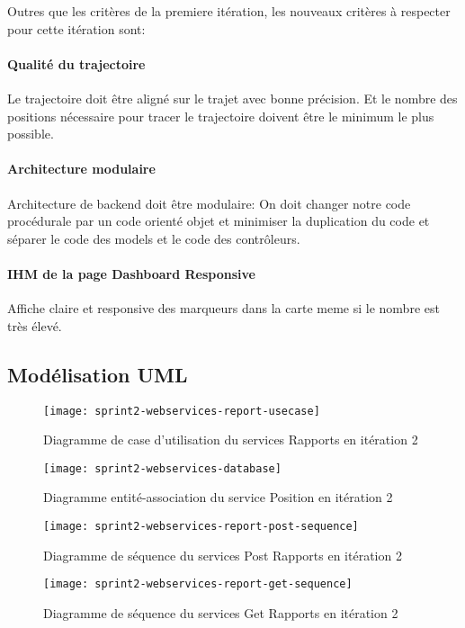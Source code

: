 Outres que les critères de la premiere itération, les nouveaux critères à
respecter pour cette itération sont:

\paragraph{Qualité du trajectoire}
Le trajectoire doit être aligné sur le trajet avec bonne précision. Et le
nombre des positions nécessaire pour tracer le trajectoire doivent être le
minimum le plus possible.

\paragraph{Architecture modulaire}
Architecture de backend doit être modulaire: On doit changer notre code
procédurale par un code orienté objet et minimiser la duplication du code et
séparer le code des models et le code des contrôleurs.

\paragraph{IHM de la page Dashboard Responsive}
Affiche claire et responsive des marqueurs dans la carte meme si le nombre est
très élevé.

\subsection{Modélisation UML}

\begin{figure}[htbp]
    \centering
    \texttt{[image: sprint2-webservices-report-usecase]}
    \caption{Diagramme de case d'utilisation du services Rapports en itération 2}
\end{figure}

\begin{figure}[htbp]
    \centering
    \texttt{[image: sprint2-webservices-database]}
    \caption{Diagramme entité-association du service Position en itération 2}
\end{figure}

\begin{figure}[htbp]
    \centering
    \texttt{[image: sprint2-webservices-report-post-sequence]}
    \caption{Diagramme de séquence du services Post Rapports en itération 2}
\end{figure}

\begin{figure}[htbp]
    \centering
    \texttt{[image: sprint2-webservices-report-get-sequence]}
    \caption{Diagramme de séquence du services Get Rapports en itération 2}
\end{figure}

